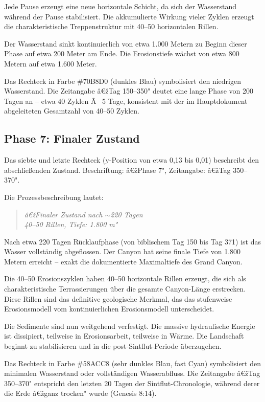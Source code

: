 ﻿\documentclass[12pt,a4paper]{report}
\begin{document}
Jede Pause erzeugt eine neue horizontale Schicht, da sich der Wasserstand während der Pause stabilisiert. Die akkumulierte Wirkung vieler Zyklen erzeugt die charakteristische Treppenstruktur mit 40--50 horizontalen Rillen.

Der Wasserstand sinkt kontinuierlich von etwa 1.000 Metern zu Beginn dieser Phase auf etwa 200 Meter am Ende. Die Erosionstiefe wächst von etwa 800 Metern auf etwa 1.600 Meter.

Das Rechteck in Farbe \#70B8D0 (dunkles Blau) symbolisiert den niedrigen Wasserstand. Die Zeitangabe â€žTag 150--350" deutet eine lange Phase von 200 Tagen an -- etwa 40 Zyklen Ã  5 Tage, konsistent mit der im Hauptdokument abgeleiteten Gesamtzahl von 40--50 Zyklen.

\subsection{Phase 7: Finaler Zustand}

Das siebte und letzte Rechteck (y-Position von etwa 0,13 bis 0,01) beschreibt den abschließenden Zustand. Beschriftung: â€žPhase 7", Zeitangabe: â€žTag 350--370".

Die Prozessbeschreibung lautet:
\begin{quote}
	\textit{â€žFinaler Zustand nach $\sim$220 Tagen\\
		40--50 Rillen, Tiefe: 1.800 m"}
\end{quote}
		
Nach etwa 220 Tagen Rücklaufphase (von biblischem Tag 150 bis Tag 371) ist das Wasser vollständig abgeflossen. Der Canyon hat seine finale Tiefe von 1.800 Metern erreicht -- exakt die dokumentierte Maximaltiefe des Grand Canyon.

Die 40--50 Erosionszyklen haben 40--50 horizontale Rillen erzeugt, die sich als charakteristische Terrassierungen über die gesamte Canyon-Länge erstrecken. Diese Rillen sind das definitive geologische Merkmal, das das stufenweise Erosionsmodell vom kontinuierlichen Erosionsmodell unterscheidet.

Die Sedimente sind nun weitgehend verfestigt. Die massive hydraulische Energie ist dissipiert, teilweise in Erosionsarbeit, teilweise in Wärme. Die Landschaft beginnt zu stabilisieren und in die post-Sintflut-Periode überzugehen.

Das Rechteck in Farbe \#58ACC8 (sehr dunkles Blau, fast Cyan) symbolisiert den minimalen Wasserstand oder vollständigen Wasserabfluss. Die Zeitangabe â€žTag 350--370" entspricht den letzten 20 Tagen der Sintflut-Chronologie, während derer die Erde â€žganz trocken" wurde (Genesis 8:14).
\end{document}
